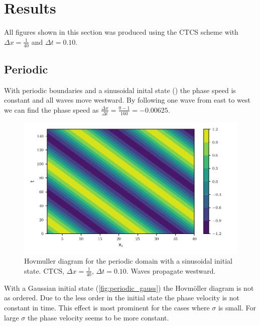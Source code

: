 \newpage
\section{Results}


All figures shown in this section was produced using the CTCS scheme with
$\Delta x = \frac{1}{40} $ and $\Delta t = 0.10$.

\subsection{Periodic}

With periodic boundaries and a sinusoidal inital state ()
the phase speed is constant and all waves move westward. By following one wave
from east to west we can find the phase speed as $\frac{\Delta x}{\Delta t} =
\frac{0-1}{160} = -0.00625$.

\begin{figure}[H]
  \centering
  \includegraphics[width=\textwidth]{../figures/psi_periodic_centered_short.pdf}
  \caption{Hovmuller diagram for the periodic domain with a sinusoidal initial state. CTCS, $\Delta x = \frac{1}{40}$, $\Delta t = 0.10$. Waves propagate westward.}
  \label{fig:periodic_sine}
\end{figure}

With a Gaussian initial state (\cref{fig:periodic_gauss}) the Hovmöller diagram
is not as ordered. Due to the less order in the initial state the phase velocity
is not constant in time. This effect is most prominent for the cases where
$\sigma$ is small. For large $\sigma$ the phase velocity seems to be more
constant.


